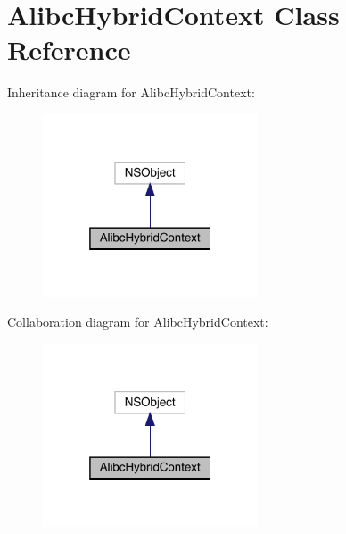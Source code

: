 \hypertarget{interface_alibc_hybrid_context}{}\section{Alibc\+Hybrid\+Context Class Reference}
\label{interface_alibc_hybrid_context}


Inheritance diagram for Alibc\+Hybrid\+Context\+:\nopagebreak
\begin{figure}[H]
\begin{center}
\leavevmode
\includegraphics[width=181pt]{interface_alibc_hybrid_context__inherit__graph}
\end{center}
\end{figure}


Collaboration diagram for Alibc\+Hybrid\+Context\+:\nopagebreak
\begin{figure}[H]
\begin{center}
\leavevmode
\includegraphics[width=181pt]{interface_alibc_hybrid_context__coll__graph}
\end{center}
\end{figure}
